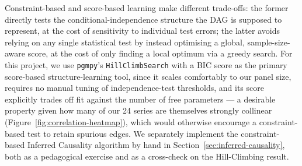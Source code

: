 Constraint-based and score-based learning make different trade-offs: the
former directly tests the conditional-independence structure the DAG is
supposed to represent, at the cost of sensitivity to individual test errors;
the latter avoids relying on any single statistical test by instead
optimising a global, sample-size-aware score, at the cost of only finding a
local optimum via a greedy search. For this project, we use
\texttt{pgmpy}'s \texttt{HillClimbSearch} with a BIC score as the primary
score-based structure-learning tool, since it scales comfortably to our panel size, requires no manual tuning of independence-test thresholds, and its score explicitly trades off fit against the number of free parameters — a desirable property given how many of our 24 series are
themselves strongly collinear (Figure~\ref{fig:correlation-heatmap}), which
would otherwise encourage a constraint-based test to retain spurious edges.
We separately implement the constraint-based Inferred Causality algorithm by hand in Section~\ref{sec:inferred-causality}, both as a pedagogical
exercise and as a cross-check on the Hill-Climbing result.
